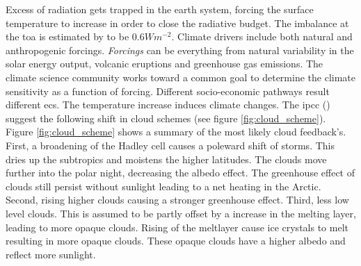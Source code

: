 Excess of radiation gets trapped in the earth system, forcing the surface temperature to increase in order to close the radiative budget. The imbalance at the \acrfull{toa} is estimated by \cite{Wild2019TheModels} to be $0.6W m^{-2}$. 
Climate drivers include both natural and anthropogenic forcings. \textit{Forcings} can be everything from natural variability in the solar energy output, volcanic eruptions and greenhouse gas emissions. The climate science community works toward a common goal to determine the climate sensitivity as a function of forcing. Different socio-economic pathways result different \acrshort{ecs}. The temperature increase induces climate changes. The \acrfull{ipcc} (\cite{IPCC_CH7_clouds}) suggest the following shift in cloud schemes (see figure \ref{fig:cloud_scheme}). Figure \ref{fig:cloud_scheme} shows a summary of the most likely cloud feedback's. First, a broadening of the Hadley cell causes a poleward shift of storms. This dries up the subtropics and moistens the higher latitudes. The clouds move further into the polar night, decreasing the albedo effect. The greenhouse effect of clouds still persist without sunlight leading to a net heating in the Arctic. Second, rising higher clouds causing a stronger greenhouse effect. Third, less low level clouds. This is assumed to be partly offset by a increase in the melting layer, leading to more opaque clouds. Rising of the meltlayer cause ice crystals to melt resulting in more opaque clouds. These opaque clouds have a higher albedo and reflect more sunlight. 